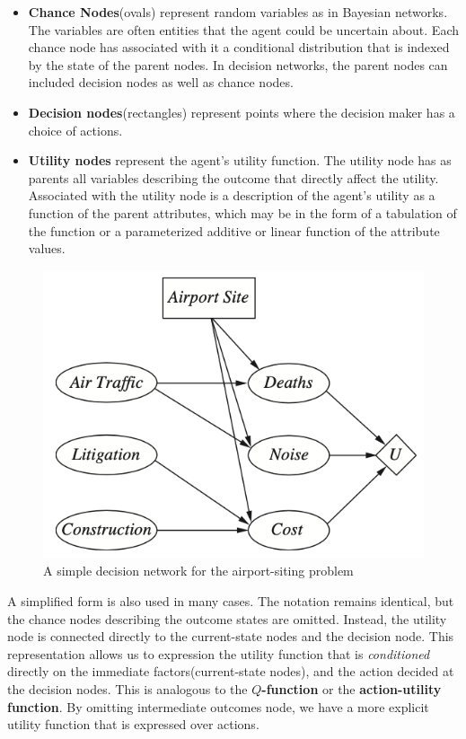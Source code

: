 \documentclass[11pt]{article}
\begin{document}
\begin{itemize}
    \item \textbf{Chance Nodes}(ovals) represent random variables as in Bayesian networks. The variables are often entities that the agent could be uncertain about. Each chance node has associated with it a conditional distribution that is indexed by the state of the parent nodes. In decision networks, the parent nodes can included decision nodes as well as chance nodes.
    \item \textbf{Decision nodes}(rectangles) represent points where the decision maker has a choice of actions.
    \item \textbf{Utility nodes} represent the agent's utility function. The utility node has as parents all variables describing the outcome that directly affect the utility. Associated with the utility node is a description of the agent's utility as a function of the parent attributes, which may be in the form of a tabulation of the function or a parameterized additive or linear function of the attribute values.
\end{itemize}

\begin{figure}[!htb]
    \centering
    \includegraphics{images/decision-network.png}
    \caption{A simple decision network for the airport-siting problem}
    \label{fig:dn}
\end{figure}

A simplified form is also used in many cases. The notation remains identical, but the chance nodes describing the outcome states are omitted. Instead, the utility node is connected directly to the current-state nodes and the decision node. This representation allows us to expression the utility function that is \textit{conditioned} directly on the immediate factors(current-state nodes), and the action decided at the decision nodes. This is analogous to the \textbf{$Q$-function} or the \textbf{action-utility function}. By omitting intermediate outcomes node, we have a more explicit utility function that is expressed over actions.
\end{document}
